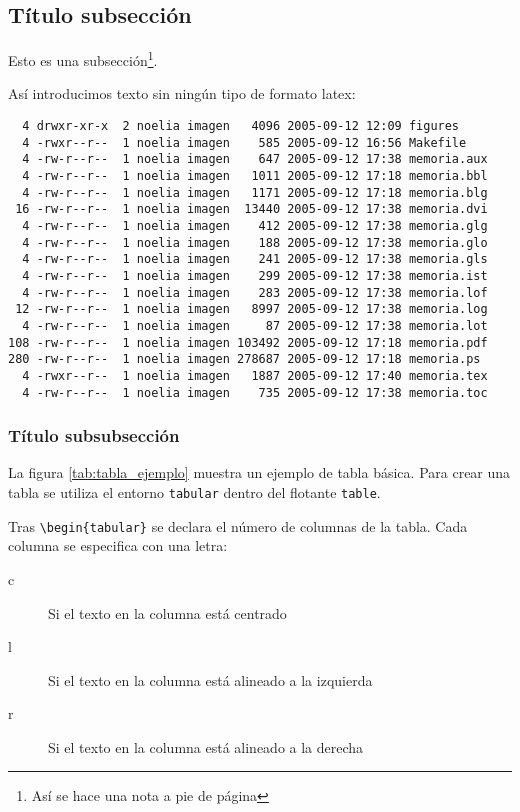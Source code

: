 \subsection{Título subsección}

Esto es una subsección\footnote{Así se hace una nota a pie de página}.


Así introducimos texto sin ningún tipo de formato latex:
\begin{verbatim}
  4 drwxr-xr-x  2 noelia imagen   4096 2005-09-12 12:09 figures
  4 -rwxr--r--  1 noelia imagen    585 2005-09-12 16:56 Makefile
  4 -rw-r--r--  1 noelia imagen    647 2005-09-12 17:38 memoria.aux
  4 -rw-r--r--  1 noelia imagen   1011 2005-09-12 17:18 memoria.bbl
  4 -rw-r--r--  1 noelia imagen   1171 2005-09-12 17:18 memoria.blg
 16 -rw-r--r--  1 noelia imagen  13440 2005-09-12 17:38 memoria.dvi
  4 -rw-r--r--  1 noelia imagen    412 2005-09-12 17:38 memoria.glg
  4 -rw-r--r--  1 noelia imagen    188 2005-09-12 17:38 memoria.glo
  4 -rw-r--r--  1 noelia imagen    241 2005-09-12 17:38 memoria.gls
  4 -rw-r--r--  1 noelia imagen    299 2005-09-12 17:38 memoria.ist
  4 -rw-r--r--  1 noelia imagen    283 2005-09-12 17:38 memoria.lof
 12 -rw-r--r--  1 noelia imagen   8997 2005-09-12 17:38 memoria.log
  4 -rw-r--r--  1 noelia imagen     87 2005-09-12 17:38 memoria.lot
108 -rw-r--r--  1 noelia imagen 103492 2005-09-12 17:18 memoria.pdf
280 -rw-r--r--  1 noelia imagen 278687 2005-09-12 17:18 memoria.ps
  4 -rwxr--r--  1 noelia imagen   1887 2005-09-12 17:40 memoria.tex
  4 -rw-r--r--  1 noelia imagen    735 2005-09-12 17:38 memoria.toc
\end{verbatim}



\subsubsection{Título subsubsección}

La figura \ref{tab:tabla_ejemplo} muestra un ejemplo de tabla básica. Para crear una tabla se utiliza el entorno \texttt{tabular} dentro del flotante \texttt{table}. 


Tras \texttt{\textbackslash begin\{tabular\}} se declara el número de columnas de la tabla. Cada columna se especifica con una letra:
\begin{description}
    \item [c] Si el texto en la columna está centrado
    \item [l] Si el texto en la columna está alineado a la izquierda
    \item [r] Si el texto en la columna está alineado a la derecha
\end{description}

